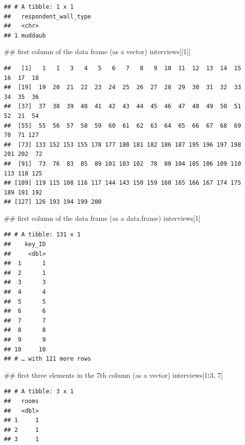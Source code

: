 \documentclass[]{book}
\newenvironment{Shaded}{\begin{snugshade}}{\end{snugshade}}
\newcommand{\DecValTok}[1]{\textcolor[rgb]{0.00,0.00,0.81}{#1}}
\newcommand{\OperatorTok}[1]{\textcolor[rgb]{0.81,0.36,0.00}{\textbf{#1}}}
\newcommand{\NormalTok}[1]{#1}
\begin{document}
\begin{verbatim}
## # A tibble: 1 x 1
##   respondent_wall_type
##   <chr>               
## 1 muddaub
\end{verbatim}

\begin{Shaded}
\begin{Highlighting}[]
\NormalTok{## first column of the data frame (as a vector)}
\NormalTok{interviews[[}\DecValTok{1}\NormalTok{]]}
\end{Highlighting}
\end{Shaded}

\begin{verbatim}
##   [1]   1   1   3   4   5   6   7   8   9  10  11  12  13  14  15  16  17  18
##  [19]  19  20  21  22  23  24  25  26  27  28  29  30  31  32  33  34  35  36
##  [37]  37  38  39  40  41  42  43  44  45  46  47  48  49  50  51  52  21  54
##  [55]  55  56  57  58  59  60  61  62  63  64  65  66  67  68  69  70  71 127
##  [73] 133 152 153 155 178 177 180 181 182 186 187 195 196 197 198 201 202  72
##  [91]  73  76  83  85  89 101 103 102  78  80 104 105 106 109 110 113 118 125
## [109] 119 115 108 116 117 144 143 150 159 160 165 166 167 174 175 189 191 192
## [127] 126 193 194 199 200
\end{verbatim}

\begin{Shaded}
\begin{Highlighting}[]
\NormalTok{## first column of the data frame (as a data.frame)}
\NormalTok{interviews[}\DecValTok{1}\NormalTok{]}
\end{Highlighting}
\end{Shaded}

\begin{verbatim}
## # A tibble: 131 x 1
##    key_ID
##     <dbl>
##  1      1
##  2      1
##  3      3
##  4      4
##  5      5
##  6      6
##  7      7
##  8      8
##  9      9
## 10     10
## # … with 121 more rows
\end{verbatim}

\begin{Shaded}
\begin{Highlighting}[]
\NormalTok{## first three elements in the 7th column (as a vector)}
\NormalTok{interviews[}\DecValTok{1}\OperatorTok{:}\DecValTok{3}\NormalTok{, }\DecValTok{7}\NormalTok{]}
\end{Highlighting}
\end{Shaded}

\begin{verbatim}
## # A tibble: 3 x 1
##   rooms
##   <dbl>
## 1     1
## 2     1
## 3     1
\end{verbatim}
\end{document}

